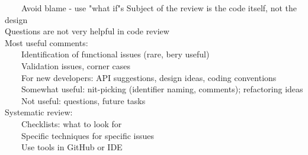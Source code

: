 \documentclass[10pt,letterpaper,unboxed,cm]{article}
\newcommand{\tab}{~~~~}
\begin{document}
\tab Avoid blame - use "what if"s
Subject of the review is the code itself, not the design\\
Questions are not very helpful in code review\\
Most useful comments: \\
\tab Identification of functional issues (rare, bery useful)\\
\tab Validation issues, corner cases\\
\tab For new developers: API suggestions, design ideas, coding conventions\\
\tab Somewhat useful: nit-picking (identifier naming, comments); refactoring ideas\\
\tab Not useful: questions, future tasks\\
Systematic review: \\
\tab Checklists: what to look for\\
\tab Specific techniques for specific issues\\
\tab Use tools in GitHub or IDE\\
\end{document}
